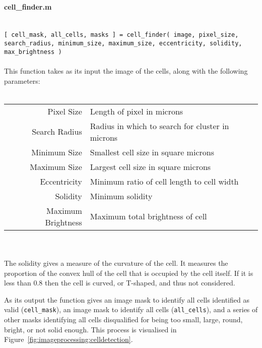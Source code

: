 \documentclass[../main.tex]{subfiles}
\begin{document}
\paragraph{cell\_finder.m}\ \\
\texttt{[ cell\_mask, all\_cells, masks ] = cell\_finder( image, pixel\_size, search\_radius, minimum\_size, maximum\_size, eccentricity, solidity, max\_brightness ) }
\\\\
This function takes as its input the image of the cells, along with the following parameters:
\\\\
\begin{tabular}{rl}
Pixel Size		&	Length of pixel in microns\\
Search Radius 	&	Radius in which to search for cluster in microns\\
Minimum Size		&	Smallest cell size in square microns\\
Maximum Size		&	Largest cell size in square microns\\
Eccentricity		&	Minimum ratio of cell length to cell width\\
Solidity			&	Minimum solidity\\
Maximum Brightness	&	Maximum total brightness of cell
\end{tabular}
\\\\
The solidity gives a measure of the curvature of the cell. It measures the proportion of the convex hull of the cell that is occupied by the cell itself. If it is less than 0.8 then the cell is curved, or T-shaped, and thus not considered.

As its output the function gives an image mask to identify all cells identified as valid (\texttt{cell\_mask}), an image mask to identify all cells (\texttt{all\_cells}), and a series of other masks identifying all cells disqualified for being too small, large, round, bright, or not solid enough. This process is visualised in Figure~\ref{fig:imageprocessing:celldetection}.
\end{document}
